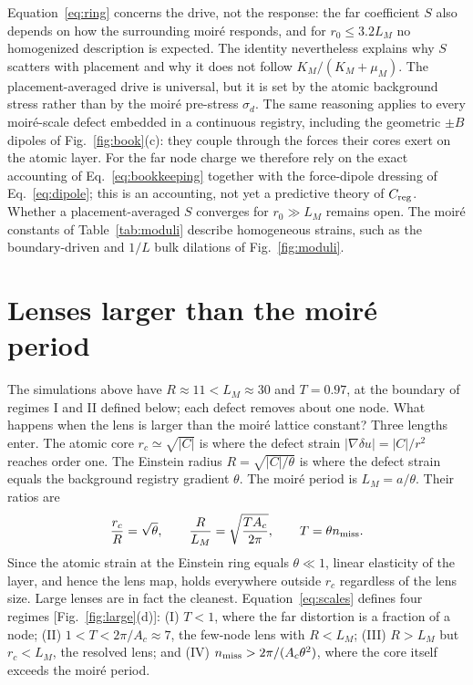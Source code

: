 \documentclass[prb,twocolumn,superscriptaddress,floatfix,10pt]{revtex4-2}
\begin{document}
Equation~\eqref{eq:ring} concerns the drive, not the response: the far coefficient $S$ also depends on how the surrounding moir\'e responds, and for $r_0\le3.2L_M$ no homogenized description is expected. The identity nevertheless explains why $S$ scatters with placement and why it does not follow $K_M/(K_M+\mu_M)$. The placement-averaged drive is universal, but it is set by the atomic background stress rather than by the moir\'e pre-stress $\sigma_d$. The same reasoning applies to every moir\'e-scale defect embedded in a continuous registry, including the geometric $\pm B$ dipoles of Fig.~\ref{fig:book}(c): they couple through the forces their cores exert on the atomic layer. For the far node charge we therefore rely on the exact accounting of Eq.~\eqref{eq:bookkeeping} together with the force-dipole dressing of Eq.~\eqref{eq:dipole}; this is an accounting, not yet a predictive theory of $C_{\rm reg}$. Whether a placement-averaged $S$ converges for $r_0\gg L_M$ remains open. The moir\'e constants of Table~\ref{tab:moduli} describe homogeneous strains, such as the boundary-driven and $1/L$ bulk dilations of Fig.~\ref{fig:moduli}.

\section{Lenses larger than the moir\'e period}\label{sec:large}

The simulations above have $R\approx11<L_M\approx30$ and $T=0.97$, at the boundary of regimes I and II defined below; each defect removes about one node. What happens when the lens is larger than the moir\'e lattice constant? Three lengths enter. The atomic core $r_c\simeq\sqrt{|C|}$ is where the defect strain $|\nabla\delta u|=|C|/r^2$ reaches order one. The Einstein radius $R=\sqrt{|C|/\theta}$ is where the defect strain equals the background registry gradient $\theta$. The moir\'e period is $L_M=a/\theta$. Their ratios are
\begin{equation}
\frac{r_c}{R}=\sqrt{\theta},\qquad \frac{R}{L_M}=\sqrt{\frac{TA_c}{2\pi}},\qquad T=\theta n_{\rm miss}.
\label{eq:scales}
\end{equation}
Since the atomic strain at the Einstein ring equals $\theta\ll1$, linear elasticity of the layer, and hence the lens map, holds everywhere outside $r_c$ regardless of the lens size. Large lenses are in fact the cleanest. Equation~\eqref{eq:scales} defines four regimes [Fig.~\ref{fig:large}(d)]: (I) $T<1$, where the far distortion is a fraction of a node; (II) $1<T<2\pi/A_c\approx7$, the few-node lens with $R<L_M$; (III) $R>L_M$ but $r_c<L_M$, the resolved lens; and (IV) $n_{\rm miss}>2\pi/(A_c\theta^2)$, where the core itself exceeds the moir\'e period.
\end{document}
